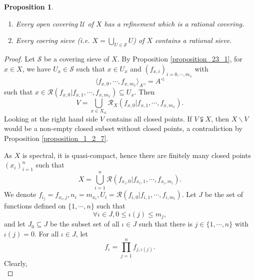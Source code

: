 \documentclass[8pt]{article}
\numberwithin{equation}{section}
\newtheorem{proposition}{Proposition}[subsection]
\newcommand{\U}[0]{\mathcal{U}}
\newcommand{\cR}[0]{\mathcal{R}}
\newcommand{\sS}[0]{\mathscr{S}}
\begin{document}
\begin{proposition}
    \label{proposition_23_2}
    $\:$
    \begin{enumerate}
        \item Every open covering $\U$ of $X$ has a refinement which is a rational covering.
        \item Every coering sieve (i.e. $X=\bigcup_{U\in\sS}U$) of $X$ contains a rational sieve.
    \end{enumerate}
\end{proposition}

\begin{proof}
    Let $\sS$ be a covering sieve of $X$. By Proposition \ref{proposition_23_1}, for $x\in X$, we have $U_x\in\sS$ such that $x\in U_x$ and $(f_{x,i})_{i=0,\cdots,m_x}$ with 
    \begin{equation*}
        \langle f_{x,0},\cdots,f_{x,m_x}\rangle_{A^\triangleleft} = A^\triangleleft
    \end{equation*}
    such that $x\in\cR(f_{x,0}|f_{x,1},\cdots,f_{x,m_x})\subseteq U_x$. Then 
    \begin{equation*}
        V = \bigcup_{x\in X_{\mathrm{cl}}}\cR_X(f_{x,0}|f_{x,1},\cdots,f_{x,m_x}).
    \end{equation*} 
    Looking at the right hand side $V$ contains all closed points. If $V\subsetneqq X$, then $X\backslash V$ would be a non-empty closed subset without closed points, a contradiction by Proposition \ref{proposition_1_2_7}.
    \par As $X$ is spectral, it is quasi-compact, hence there are finitely many closed points $(x_i)_{i=1}^n$ such that 
    \begin{equation*}
        X = \bigcup_{i=1}^n\cR(f_{x_i,0}|f_{x_i,1},\cdots,f_{x_i,m_i}).
    \end{equation*}
    We denote $f_{i_j} = f_{x_i,j},n_i = m_{x_i},U_i = \cR(f_{i,0}|f_{i,1},\cdots,f_{i,m_i})$. Let $J$ be the set of functions defined on $\{1,\cdots,n\}$ such that 
    \begin{equation*}
       \forall \iota\in J, 0\leq \iota(j)\leq m_j,
    \end{equation*}
    and let $J_0\subseteq J$ be the subset set of all $\iota\in J$ such that there is $j\in\{1,\cdots,n\}$ with $\iota(j)=0$. For all $\iota\in J$, let 
    \begin{equation*}
        f_\iota = \prod_{j=1}^nf_{j,\iota(j)}.
    \end{equation*}
    Clearly, 
    \begin{equation*}

\end{equation*}
\end{proof}
\end{document}
